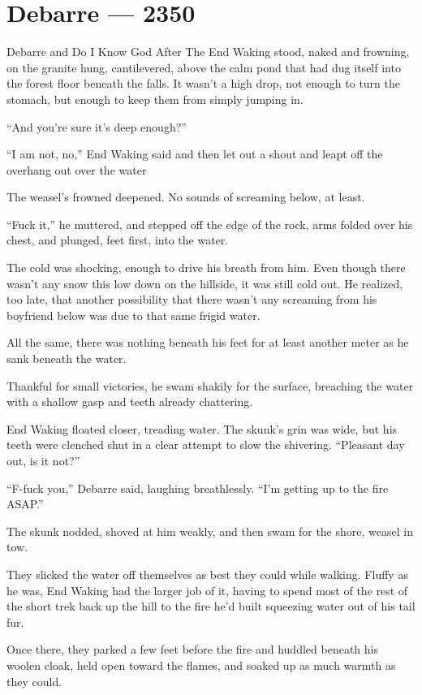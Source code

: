 \hypertarget{debarre-2350}{%
\chapter{Debarre — 2350}\label{debarre-2350}}

Debarre and Do I Know God After The End Waking stood, naked and frowning, on the granite hung, cantilevered, above the calm pond that had dug itself into the forest floor beneath the falls. It wasn't a high drop, not enough to turn the stomach, but enough to keep them from simply jumping in.

``And you're sure it's deep enough?''

``I am not, no,'' End Waking said and then let out a shout and leapt off the overhang out over the water

The weasel's frowned deepened. No sounds of screaming below, at least.

``Fuck it,'' he muttered, and stepped off the edge of the rock, arms folded over his chest, and plunged, feet first, into the water.

The cold was shocking, enough to drive his breath from him. Even though there wasn't any snow this low down on the hillside, it was still cold out. He realized, too late, that another possibility that there wasn't any screaming from his boyfriend below was due to that same frigid water.

All the same, there was nothing beneath his feet for at least another meter as he sank beneath the water.

Thankful for small victories, he swam shakily for the surface, breaching the water with a shallow gasp and teeth already chattering.

End Waking floated closer, treading water. The skunk's grin was wide, but his teeth were clenched shut in a clear attempt to slow the shivering. ``Pleasant day out, is it not?''

``F-fuck you,'' Debarre said, laughing breathlessly. ``I'm getting up to the fire ASAP.''

The skunk nodded, shoved at him weakly, and then swam for the shore, weasel in tow.

They slicked the water off themselves as best they could while walking. Fluffy as he was, End Waking had the larger job of it, having to spend most of the rest of the short trek back up the hill to the fire he'd built squeezing water out of his tail fur.

Once there, they parked a few feet before the fire and huddled beneath his woolen cloak, held open toward the flames, and soaked up as much warmth as they could.

